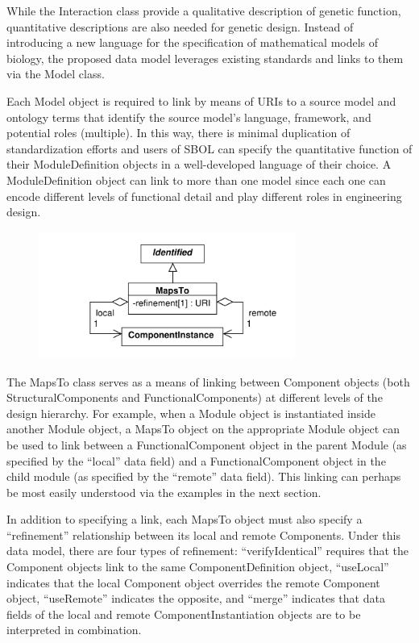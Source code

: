 \documentclass[draftspec]{sbmlpkgspec}
\begin{document}
While the Interaction class provide a qualitative description of genetic function, quantitative descriptions are also needed for genetic design. Instead of introducing a new language for the specification of mathematical models of biology, the proposed data model leverages existing standards and links to them via the Model class. 

Each Model object is required to link by means of URIs to a source model and ontology terms that identify the source model's language, framework, and potential roles (multiple). In this way, there is minimal duplication of standardization efforts and users of SBOL can specify the quantitative function of their ModuleDefinition objects in a well-developed language of their choice. A ModuleDefinition object can link to more than one model since each one can encode different levels of functional detail and play different roles in engineering design. 


\begin{figure}[h]
\begin{center}
\includegraphics[width=0.75\textwidth]{uml/maps_to}
\caption[]{}
\label{uml:maps_to}
\end{center}
\end{figure}

The MapsTo class serves as a means of linking between Component objects (both StructuralComponents and FunctionalComponents) at different levels of the design hierarchy. For example, when a Module object is instantiated inside another Module object, a MapsTo object on the appropriate Module  object can be used to link between a FunctionalComponent object in the parent Module (as specified by the “local” data field) and a FunctionalComponent object in the child module (as specified by the “remote” data field). This linking can perhaps be most easily understood via the examples in the next section.

In addition to specifying a link, each MapsTo object must also specify a “refinement” relationship between its local and remote Components. Under this data model, there are four types of refinement: “verifyIdentical” requires that the Component objects link to the same ComponentDefinition object, “useLocal” indicates that the local Component object overrides the remote Component object, “useRemote” indicates the opposite, and “merge” indicates that data fields of the local and remote ComponentInstantiation objects are to be interpreted in combination.
\end{document}
